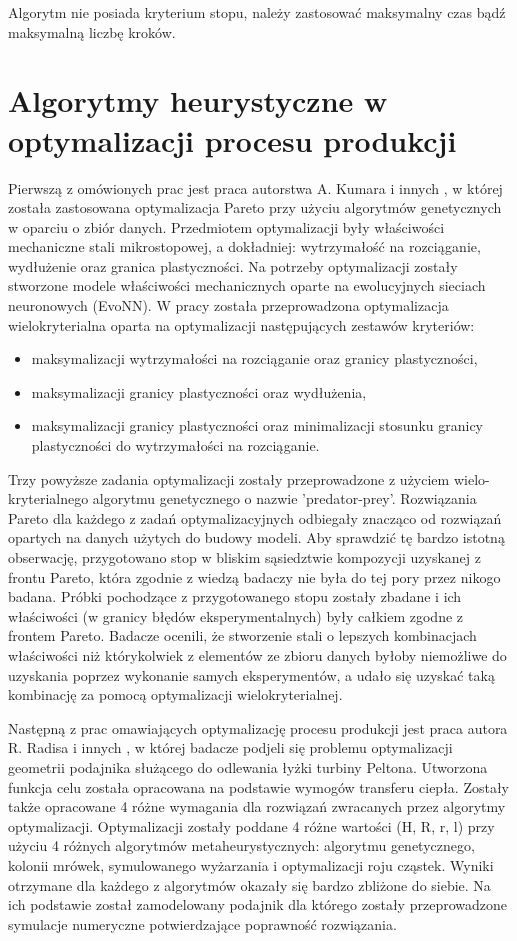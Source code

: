 Algorytm nie posiada kryterium stopu, należy zastosować maksymalny czas bądź maksymalną liczbę kroków.

\section{Algorytmy heurystyczne w optymalizacji pro\-ce\-su pro\-du\-kcji}

Pierwszą z omówionych prac jest praca autorstwa A. Kumara i innych \cite{doi:10.1002/srin.201100189}, w której została zastosowana optymalizacja Pareto przy użyciu algorytmów genetycznych w oparciu o zbiór danych. Przedmiotem optymalizacji były właściwości mechaniczne stali mikrostopowej, a dokładniej: wytrzymałość na rozciąganie, wydłużenie oraz granica plastyczności. Na potrzeby optymalizacji zostały stworzone modele właściwości mechanicznych oparte na ewolucyjnych sieciach neuronowych (EvoNN). W pracy została przeprowadzona optymalizacja wielokryterialna oparta na optymalizacji następujących zestawów kryteriów:
\begin{itemize}
    \item maksymalizacji wytrzymałości na rozciąganie oraz granicy plastyczności,
    \item maksymalizacji granicy plastyczności oraz wydłużenia,
    \item maksymalizacji granicy plastyczności oraz minimalizacji stosunku granicy plastyczności do wytrzymałości na rozciąganie.
\end{itemize}
Trzy powyższe zadania optymalizacji zostały przeprowadzone z użyciem wielo-kryterialnego algorytmu genetycznego o nazwie 'predator-prey'. Rozwiązania Pareto dla każdego z zadań optymalizacyjnych odbiegały znacząco od rozwiązań opartych na danych użytych do budowy modeli. Aby sprawdzić tę bardzo istotną obserwację, przygotowano stop w bliskim sąsiedztwie kompozycji uzyskanej z frontu Pareto, która zgodnie z wiedzą badaczy nie była do tej pory przez nikogo badana. Próbki pochodzące z przygotowanego stopu zostały zbadane i ich właściwości (w granicy błędów eksperymentalnych) były całkiem zgodne z frontem Pareto. Badacze ocenili, że stworzenie stali o lepszych kombinacjach właściwości niż którykolwiek z elementów ze zbioru danych byłoby niemożliwe do uzyskania poprzez wykonanie samych eksperymentów, a udało się uzyskać taką kombinację za pomocą optymalizacji wielokryterialnej.

Następną z prac omawiających optymalizację procesu produkcji jest praca autora R. Radisa i innych \cite{radivsa2017casting}, w której badacze podjeli się problemu optymalizacji geometrii podajnika służącego do odlewania łyżki turbiny Peltona. Utworzona funkcja celu została opracowana na podstawie wymogów transferu ciepła. Zostały także opracowane 4 różne wymagania dla rozwiązań zwracanych przez algorytmy optymalizacji. Optymalizacji zostały poddane 4 różne wartości (H, R, r, l) przy użyciu 4 różnych algorytmów metaheurystycznych: algorytmu genetycznego, kolonii mrówek, symulowanego wyżarzania i optymalizacji roju cząstek. Wyniki otrzymane dla każdego z algorytmów okazały się bardzo zbliżone do siebie. Na ich podstawie został zamodelowany podajnik dla którego zostały przeprowadzone symulacje numeryczne potwierdzające poprawność rozwiązania.
